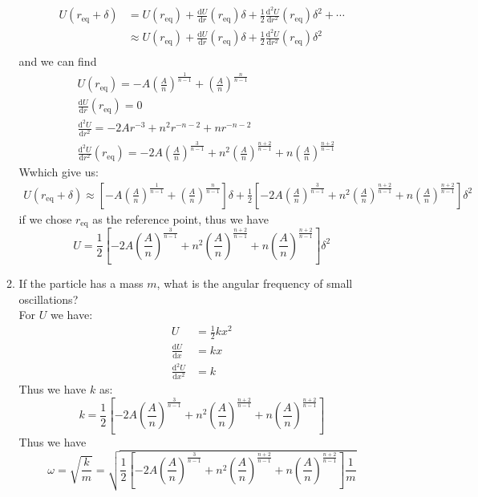 \documentclass{article}
\newcommand{\de}{\mathrm{d}}
\begin{document}
\begin{enumerate}
\begin{enumerate}
        \begin{align*}
            U(r_\text{eq}+\delta) &= U(r_\text{eq}) + \frac{\de U}{\de r} (r_\text{eq}) \delta + \frac{1}{2}\frac{\de^2 U}{\de r^2} (r_\text{eq}) \delta^2 + \cdots\\
            &\approx  U(r_\text{eq}) + \frac{\de U}{\de r} (r_\text{eq}) \delta + \frac{1}{2}\frac{\de^2 U}{\de r^2} (r_\text{eq}) \delta^2 \\
        \end{align*}
        and we can find
        \begin{align*}
            &U(r_\text{eq}) = -A (\frac{A}{n})^\frac{1}{n-1} + (\frac{A}{n})^\frac{n}{n-1}\\
            &\frac{\de U}{\de r} (r_\text{eq}) = 0 \\
            &\frac{\de^2 U}{\de r^2} = -2 Ar^{-3} + n^2 r^{-n-2} + nr^{-n-2} \\
            &\frac{\de^2 U}{\de r^2} (r_\text{eq}) = -2 A(\frac{A}{n})^\frac{3}{n-1} + n^2 (\frac{A}{n})^\frac{n+2}{n-1} + n(\frac{A}{n})^\frac{n+2}{n-1}
        \end{align*}
        Wwhich give us:
        \begin{align*}
            U(r_\text{eq}+\delta) \approx 
                \left[-A (\frac{A}{n})^\frac{1}{n-1} + (\frac{A}{n})^\frac{n}{n-1}\right]\delta
                +\frac{1}{2}\left[-2 A(\frac{A}{n})^\frac{3}{n-1} + n^2 (\frac{A}{n})^\frac{n+2}{n-1} + n(\frac{A}{n})^\frac{n+2}{n-1}\right]\delta^2
        \end{align*}
        if we chose $r_\text{eq}$ as the reference point, thus we have
        \[
            U = \frac{1}{2}\left[-2 A(\frac{A}{n})^\frac{3}{n-1} + n^2 (\frac{A}{n})^\frac{n+2}{n-1} + n(\frac{A}{n})^\frac{n+2}{n-1}\right]\delta^2
        \]
        \item If the particle has a mass $m$, what is the angular frequency of small oscillations?\\

        For $U$ we have:
        \begin{align*}
            U &= \frac{1}{2}kx^2 \\
            \frac{\de U}{\de x} &= kx \\
            \frac{\de^2 U}{\de x^2} &= k
        \end{align*}
        Thus we have $k$ as:
        \[
        k = \frac{1}{2}[-2 A(\frac{A}{n})^\frac{3}{n-1} + n^2 (\frac{A}{n})^\frac{n+2}{n-1} + n(\frac{A}{n})^\frac{n+2}{n-1}]
        \]
        Thus we have
        \[
        \omega = \sqrt{\frac{k}{m}} = \sqrt{\frac{1}{2}\left[-2 A(\frac{A}{n})^\frac{3}{n-1} + n^2 (\frac{A}{n})^\frac{n+2}{n-1} + n(\frac{A}{n})^\frac{n+2}{n-1}\right] \frac{1}{m}}
        \]


\end{enumerate}
\end{enumerate}
\end{document}
